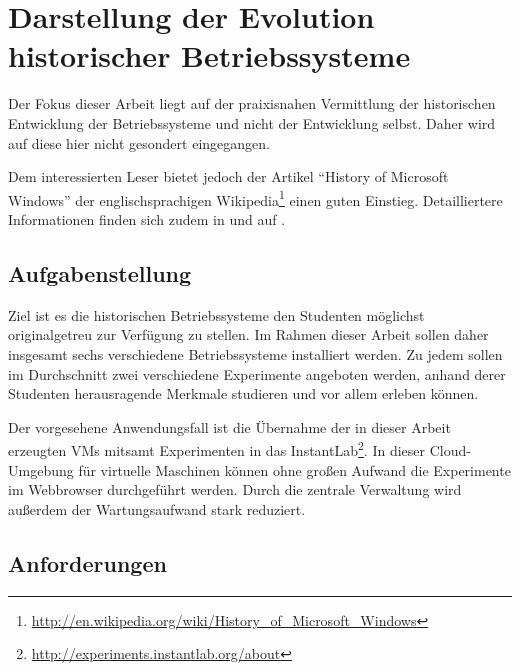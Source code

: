 \chapter{Darstellung der Evolution historischer Betriebssysteme}
\label{chap:challenges}

Der Fokus dieser Arbeit liegt auf der praixisnahen Vermittlung der historischen Entwicklung der Betriebssysteme und nicht der Entwicklung selbst. Daher wird auf diese hier nicht gesondert eingegangen.

Dem interessierten Leser bietet jedoch der Artikel "`History of Microsoft Windows"' der englischsprachigen Wikipedia\footnote{\url{http://en.wikipedia.org/wiki/History_of_Microsoft_Windows}} einen guten Einstieg.
Detailliertere Informationen finden sich zudem in \cite{WinInt1} und auf \cite{WinHistory}.

\section{Aufgabenstellung}
\label{sec:aims}


		Ziel ist es die historischen Betriebssysteme den Studenten möglichst originalgetreu zur Verfügung zu stellen. 
		Im Rahmen dieser Arbeit sollen daher insgesamt sechs verschiedene Betriebssysteme installiert werden. 
		Zu jedem sollen im Durchschnitt zwei verschiedene Experimente angeboten werden, anhand derer Studenten herausragende Merkmale studieren und vor allem erleben können.

		Der vorgesehene Anwendungsfall ist die Übernahme der in dieser Arbeit erzeugten VMs mitsamt Experimenten in das InstantLab\footnote{\url{http://experiments.instantlab.org/about}}. 
		In dieser Cloud-Umgebung für virtuelle Maschinen können ohne großen Aufwand die Experimente im Webbrowser durchgeführt werden. 
		Durch die zentrale Verwaltung wird außerdem der Wartungsaufwand stark reduziert.


\section{Anforderungen}
\label{sec:requirements}

